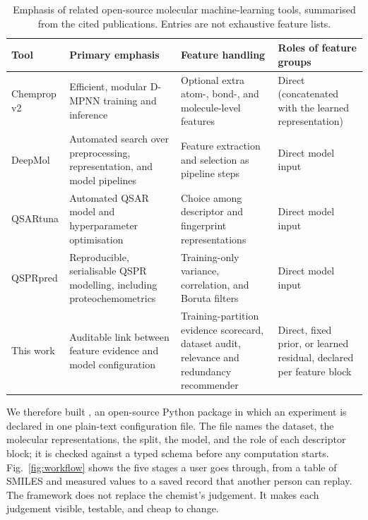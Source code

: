 \begin{table}[t]
\caption{Emphasis of related open-source molecular machine-learning tools, summarised from the cited publications. Entries are not exhaustive feature lists.}
\label{tab:positioning}
\centering
\footnotesize
\setlength{\tabcolsep}{4pt}
\begin{tabular}{@{}>{\raggedright\arraybackslash}p{}>{\raggedright\arraybackslash}p{}>{\raggedright\arraybackslash}p{}>{\raggedright\arraybackslash}p{}@{}}
\toprule
Tool & Primary emphasis & Feature handling & Roles of feature groups \\
\midrule
Chemprop v2 \cite{graff2026chemprop} & Efficient, modular D-MPNN training and inference & Optional extra atom-, bond-, and molecule-level features & Direct (concatenated with the learned representation) \\
DeepMol \cite{correia2024deepmol} & Automated search over preprocessing, representation, and model pipelines & Feature extraction and selection as pipeline steps & Direct model input \\
QSARtuna \cite{mervin2024qsartuna} & Automated QSAR model and hyperparameter optimisation & Choice among descriptor and fingerprint representations & Direct model input \\
QSPRpred \cite{vandenmaagdenberg2024qsprpred} & Reproducible, serialisable QSPR modelling, including proteochemometrics & Training-only variance, correlation, and Boruta \cite{kursa2010boruta} filters & Direct model input \\
This work & Auditable link between feature evidence and model configuration & Training-partition evidence scorecard, dataset audit, relevance and redundancy recommender & Direct, fixed prior, or learned residual, declared per feature block \\
\bottomrule
\end{tabular}
\end{table}

We therefore built \framework, an open-source Python package in which an experiment is declared in one plain-text configuration file. The file names the dataset, the molecular representations, the split, the model, and the role of each descriptor block; it is checked against a typed schema before any computation starts. Fig.~\ref{fig:workflow} shows the five stages a user goes through, from a table of SMILES and measured values to a saved record that another person can replay. The framework does not replace the chemist's judgement. It makes each judgement visible, testable, and cheap to change.

